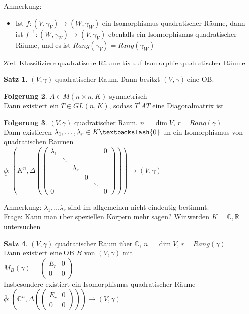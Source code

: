 \documentclass[10pt,a4paper,numbers=endperiod]{scrartcl}
\theoremstyle{definition}
\newtheorem{satz}{Satz}[section]
\newtheorem{folg}[satz]{Folgerung}
\def\CC{{\mathbb C}}
\def\RR{{\mathbb R}}
\begin{document}
Anmerkung: 
\begin{itemize}
	\item Ist $f: (V, \gamma_V) \rightarrow (W, \gamma_W)$ ein Isomorphismus quadratischer Räume, dann ist $f^{-1}: (W, \gamma_W) \rightarrow (V, \gamma_V)$ ebenfalls ein Isomorphismus quadratischer Räume, und es ist $Rang(\gamma_V) = Rang(\gamma_W)$ 
\end{itemize}

Ziel: Klassifiziere quadratische Räume bis auf Isomorphie quadratischer Räume

\begin{satz}
	$(V, \gamma)$ quadratischer Raum. Dann besitzt $(V, \gamma)$ eine OB. 
\end{satz}

\begin{folg}
	$A \in M(n \times n, K)$ symmetrisch\\
	Dann existiert ein $T \in GL(n,K)$, sodass $T^tAT$ eine Diagonalmatrix ist\\
\end{folg}

\begin{folg}
	$(V, \gamma)$ quadratischer Raum, $n = \dim V$, $r = Rang(\gamma)$\\
	Dann existieren $\lambda_1, \ldots, \lambda_r \in K\textbackslash \{0\}$ un ein Isomorphismus von quadratischen Räumen\\
	$\overline{\underline{\phi}}: (K^n, \varDelta(\begin{pmatrix}
	\lambda_1&&&&&0\\
	& \ddots&&&&\\
	&& \lambda_r&&&\\
	&&&0&&\\
	&&&&\ddots&\\
	0&&&&&0
	\end{pmatrix})) \rightarrow (V, \gamma)$
\end{folg}

Anmerkung: $\lambda_1, \ldots \lambda_r$ sind im allgemeinen nicht eindeutig bestimmt.\\

Frage: Kann man über speziellen Körpern mehr sagen? Wir werden $K = \CC, \RR$ untersuchen

\begin{satz}
	$(V, \gamma)$ quadratischer Raum über $\CC$, $n = \dim V$, $r = Rang(\gamma)$\\
	Dann existiert eine OB $B$ von $(V, \gamma)$ mit\\
	$M_B (\gamma) = \begin{pmatrix}
	E_r & 0\\
	0 & 0
	\end{pmatrix}$\\
	Insbesondere existiert ein Isomorphismus quadratischer Räume $\overline{\underline{\phi}} : (\CC^n, \varDelta(\begin{pmatrix}
	E_r & 0\\
	0 & 0
	\end{pmatrix})) \rightarrow (V, \gamma)$ 
\end{satz}
\end{document}
